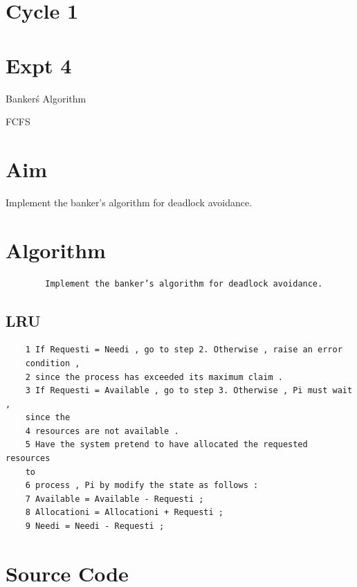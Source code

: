 \documentclass[13pt,oneside]{book}
\begin{document}
\section*{Cycle 1}
\section*{Expt 4}
\begin{center}
	\Large{Banker\'s Algorithm}
\end{center}FCFS
\section*{Aim}
\large
Implement the banker’s algorithm for deadlock avoidance.

\section*{Algorithm}
	\begin{verbatim}
		Implement the banker’s algorithm for deadlock avoidance.
	\end{verbatim}  
	\subsection*{LRU}
	\begin{verbatim}
	1 If Requesti = Needi , go to step 2. Otherwise , raise an error
	condition ,
	2 since the process has exceeded its maximum claim .
	3 If Requesti = Available , go to step 3. Otherwise , Pi must wait ,
	since the
	4 resources are not available .
	5 Have the system pretend to have allocated the requested resources
	to
	6 process , Pi by modify the state as follows :
	7 Available = Available - Requesti ;
	8 Allocationi = Allocationi + Requesti ;
	9 Needi = Needi - Requesti ;
	\end{verbatim}

\section*{Source Code}
\small
\end{document}
